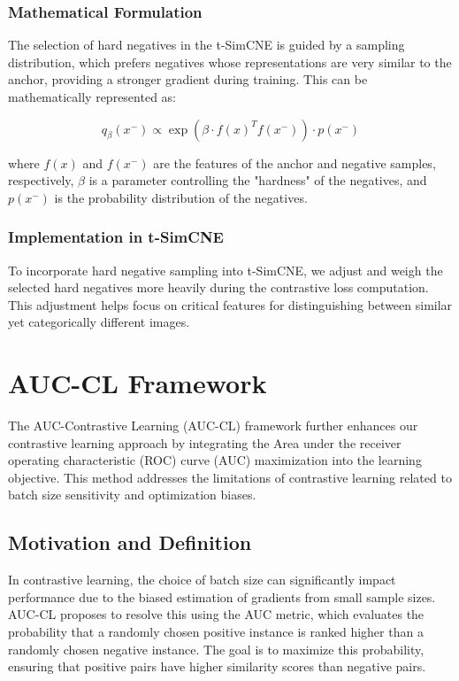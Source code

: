 \subsubsection{Mathematical Formulation}
The selection of hard negatives in the t-SimCNE is guided by a sampling distribution, which prefers negatives whose representations are very similar to the anchor, providing a stronger gradient during training. This can be mathematically represented as:

\begin{equation}
q_{\beta}(x^-) \propto \exp(\beta \cdot f(x)^T f(x^-)) \cdot p(x^-)
\end{equation}

where $f(x)$ and $f(x^-)$ are the features of the anchor and negative samples, respectively, $\beta$ is a parameter controlling the "hardness" of the negatives, and $p(x^-)$ is the probability distribution of the negatives.

\subsubsection{Implementation in t-SimCNE}
To incorporate hard negative sampling into t-SimCNE, we adjust and weigh the selected hard negatives more heavily during the contrastive loss computation. This adjustment helps focus on critical features for distinguishing between similar yet categorically different images.

\section{AUC-CL Framework}
The AUC-Contrastive Learning (AUC-CL) framework further enhances our contrastive learning approach by integrating the Area under the receiver operating characteristic (ROC) curve (AUC) maximization into the learning objective. This method addresses the limitations of contrastive learning related to batch size sensitivity and optimization biases.

\subsection{Motivation and Definition}
In contrastive learning, the choice of batch size can significantly impact performance due to the biased estimation of gradients from small sample sizes. AUC-CL proposes to resolve this using the AUC metric, which evaluates the probability that a randomly chosen positive instance is ranked higher than a randomly chosen negative instance. The goal is to maximize this probability, ensuring that positive pairs have higher similarity scores than negative pairs.

